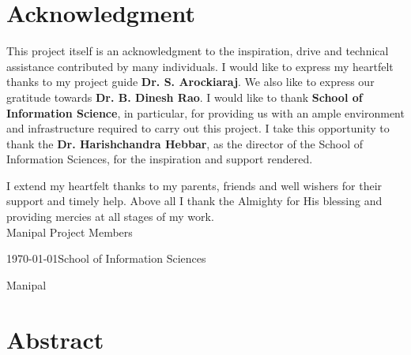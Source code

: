 \documentclass{mainreport}
\begin{document}
\maketitle

\parindent 10mm
\chapter*{Acknowledgment}\label{ack}
{\label{ack} 

\hspace{6mm} This project itself is an acknowledgment to the inspiration, drive and technical
assistance contributed by many individuals. I would like to express my heartfelt thanks to my project guide {\bf Dr. S. Arockiaraj}. We also like to express our gratitude towards {\bf Dr. B. Dinesh Rao}.
I would like to thank {\bf School of Information Science}, in particular, for providing us with an ample environment and
infrastructure required to carry out this project. I take this opportunity to thank
the {\bf Dr. Harishchandra Hebbar}, as the director of the School of Information Sciences, for the inspiration and support rendered.

I extend my heartfelt thanks to my parents, friends and well wishers for their support and timely help. Above all I thank the Almighty for His blessing and providing mercies at all stages of my work. \\[2cm]




\noindent Manipal \hfill Project Members

\noindent \today \hfill School of Information Sciences

 \hfill Manipal





}

\chapter*{Abstract}\label{Abstract}
\end{document}
